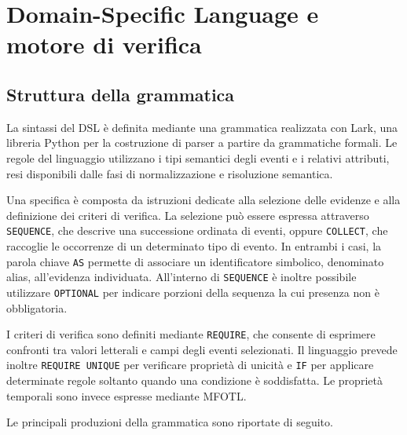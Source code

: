 \chapter{Domain-Specific Language e motore di verifica}\label{domain-specific-language-e-motore-di-verifica}

\section{Struttura della grammatica}\label{struttura-della-grammatica}

La sintassi del DSL è definita mediante una grammatica realizzata con Lark, una libreria Python per la costruzione di parser a partire da grammatiche formali. Le regole del linguaggio utilizzano i tipi semantici degli eventi e i relativi attributi, resi disponibili dalle fasi di normalizzazione e risoluzione semantica.

Una specifica è composta da istruzioni dedicate alla selezione delle evidenze e alla definizione dei criteri di verifica. La selezione può essere espressa attraverso \texttt{SEQUENCE}, che descrive una successione ordinata di eventi, oppure \texttt{COLLECT}, che raccoglie le occorrenze di un determinato tipo di evento. In entrambi i casi, la parola chiave \texttt{AS} permette di associare un identificatore simbolico, denominato alias, all'evidenza individuata. All'interno di \texttt{SEQUENCE} è inoltre possibile utilizzare \texttt{OPTIONAL} per indicare porzioni della sequenza la cui presenza non è obbligatoria.

I criteri di verifica sono definiti mediante \texttt{REQUIRE}, che consente di esprimere confronti tra valori letterali e campi degli eventi selezionati. Il linguaggio prevede inoltre \texttt{REQUIRE UNIQUE} per verificare proprietà di unicità e \texttt{IF} per applicare determinate regole soltanto quando una condizione è soddisfatta. Le proprietà temporali sono invece espresse mediante MFOTL.

Le principali produzioni della grammatica sono riportate di seguito.

